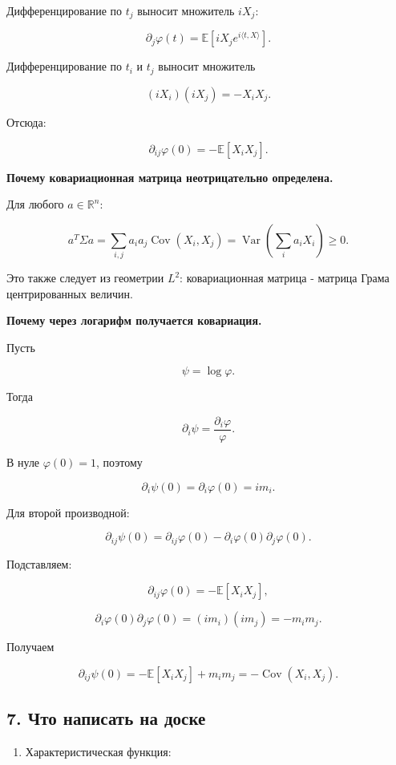 \documentclass[
  11pt,
  a4paper,
]{article}
\providecommand{\tightlist}{%
  \setlength{\itemsep}{0pt}\setlength{\parskip}{0pt}}
\begin{document}
Дифференцирование по \(t_j\) выносит множитель \(iX_j\):

\[
\partial_j\varphi(t)
=
\mathbb E[iX_je^{i\langle t,X\rangle}].
\]

Дифференцирование по \(t_i\) и \(t_j\) выносит множитель

\[
(iX_i)(iX_j)=-X_iX_j.
\]

Отсюда:

\[
\partial_{ij}\varphi(0)=-\mathbb E[X_iX_j].
\]

\textbf{Почему ковариационная матрица неотрицательно определена.}

Для любого \(a\in\mathbb R^n\):

\[
a^T\Sigma a
=
\sum_{i,j}a_i a_j\operatorname{Cov}(X_i,X_j)
=
\operatorname{Var}\left(\sum_i a_iX_i\right)
\ge0.
\]

Это также следует из геометрии \(L^2\): ковариационная матрица - матрица
Грама центрированных величин.

\textbf{Почему через логарифм получается ковариация.}

Пусть

\[
\psi=\log\varphi.
\]

Тогда

\[
\partial_i\psi=\frac{\partial_i\varphi}{\varphi}.
\]

В нуле \(\varphi(0)=1\), поэтому

\[
\partial_i\psi(0)=\partial_i\varphi(0)=im_i.
\]

Для второй производной:

\[
\partial_{ij}\psi(0)
=
\partial_{ij}\varphi(0)
-\partial_i\varphi(0)\partial_j\varphi(0).
\]

Подставляем:

\[
\partial_{ij}\varphi(0)=-\mathbb E[X_iX_j],
\]

\[
\partial_i\varphi(0)\partial_j\varphi(0)
=
(im_i)(im_j)
=
-m_im_j.
\]

Получаем

\[
\partial_{ij}\psi(0)
=
-\mathbb E[X_iX_j]+m_im_j
=
-\operatorname{Cov}(X_i,X_j).
\]

\subsection{7. Что написать на
доске}\label{ux447ux442ux43e-ux43dux430ux43fux438ux441ux430ux442ux44c-ux43dux430-ux434ux43eux441ux43aux435}

\begin{enumerate}
\def\labelenumi{\arabic{enumi}.}
\tightlist
\item
  Характеристическая функция:
\end{enumerate}
\end{document}
